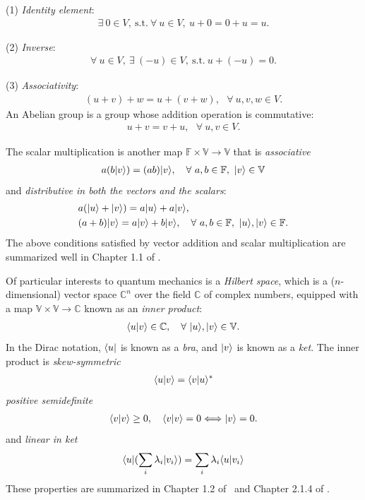 (1) \emph{Identity element}:
\begin{align}
\exists~0\in V,~\text{s.t.}~\forall~u\in V,~u+0=0+u=u.
\end{align}

(2) \emph{Inverse}:
\begin{align}
\forall~u\in V,~\exists~(-u)\in V,~\text{s.t.}~u+(-u)=0.
\end{align}

(3) \emph{Associativity}:
\begin{align}
(u+v)+w=u+(v+w),~~~\forall~u,v,w\in V.
\end{align}
An Abelian group is a group whose addition operation is commutative:
\begin{align}
u+v=v+u,~~~\forall~u,v\in V.
\end{align}

The scalar multiplication is another map $\mathbb{F}\times\mathbb{V}\rightarrow\mathbb{V}$ that is \emph{associative}
\begin{align}
    a(b|{v}\rangle)=(ab)|{v}\rangle,~~~\forall~a,b\in\mathbb{F},~|{v}\rangle\in\mathbb{V}
\end{align}
and \emph{distributive in both the vectors and the scalars}:
\begin{align}
   &a(|{u}\rangle+|{v}\rangle)=a|{u}\rangle+a|{v}\rangle,\\
   &(a+b)|{v}\rangle=a|{v}\rangle+b|{v}\rangle,~~~\forall~a,b\in\mathbb{F},~|{u}\rangle,|{v}\rangle\in\mathbb{F}.
\end{align}
The above conditions satisfied by vector addition and scalar multiplication are summarized well in Chapter 1.1 of \shankar.

Of particular interests to quantum mechanics is a \emph{Hilbert space}, which is a ($n$-dimensional) vector space $\mathbb{C}^n$ over the field $\mathbb{C}$ of complex numbers, equipped with a map $\mathbb{V}\times\mathbb{V}\rightarrow\mathbb{C}$ known as an \emph{inner product}:
\begin{align}
\langle{u|v}\rangle\in\mathbb{C},~~~\forall~|{u}\rangle,|{v}\rangle\in\mathbb{V}.
\end{align}
In the Dirac notation, $\langle{u}|$ is known as a \emph{bra}, and $|{v}\rangle$ is known as a \emph{ket}. The inner product is \emph{skew-symmetric}
\begin{align}
    \langle{u|v}\rangle=\langle{v|u}\rangle^\ast
\end{align}
\emph{positive semidefinite}
\begin{align}
    \langle{v|v}\rangle\geq0,~~~\langle{v|v}\rangle=0\Longleftrightarrow|{v}\rangle=0.
\end{align}
and \emph{linear in ket}
\begin{align}
    \langle{u}|(\sum_i\lambda_i|{v_i}\rangle)=\sum_i\lambda_i\langle{u|v_i}\rangle
\end{align}
These properties are summarized in Chapter 1.2 of \shankar~and Chapter 2.1.4 of \nielsen.

